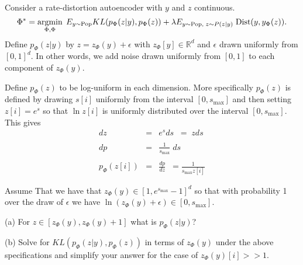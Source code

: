 \documentclass{article}
\newcommand{\solution}[1]{\bigskip {\color{red} {\bf Solution}: #1}}
\begin{document}
Consider a rate-distortion autoencoder with $y$ and $z$ continuous.
$$\Phi^* = \operatorname*{argmin}_{\Phi,\Phi}\;E_{y \sim \mathrm{Pop}} KL(p_\Phi(z|y),p_\Phi(z)) + \lambda E_{y \sim \mathrm{Pop},\;z \sim P(z|y)}\;\mathrm{Dist}(y,y_\Phi(z)).$$
Define $p_\Phi(z|y)$ by $z = z_\Phi(y) + \epsilon$ with $z_\Phi[y] \in \mathbb{R}^d$
and $\epsilon$ drawn uniformly from $[0,1]^d$. In other words,
we add noise drawn uniformly from $[0,1]$ to each component of $z_\Phi(y)$.

\medskip
Define $p_\Phi(z)$ to be log-uniform in each dimension.  More specifically
$p_\Phi(z)$ is defined by drawing $s[i]$ uniformly from the interval
$[0,s_{\mathrm{max}}]$ and then setting $z[i] = e^s$ so that $\ln z[i]$ is uniformly distributed over the interval $[0,s_{\mathrm{max}}]$.
This gives
\begin{eqnarray*}
  dz & = & e^sds  \;\;= \;zds\\
  \\
  dp & = & \frac{1}{s_{\mathrm{max}}}\;ds \\
  \\
  p_\Phi(z[i]) & = & \frac{dp}{dz} \;\;= \frac{1}{s_{\mathrm{max}}z[i]}
\end{eqnarray*}

\medskip
Assume That we have that $z_\Phi(y) \in [1,e^{s_{\mathrm{max}}}-1]^d$ so that with probability 1 over the draw of $\epsilon$ we have
$\ln(z_\Phi(y) + \epsilon) \in [0,s_{\mathrm{max}}]$.

\medskip
(a) For $z \in [z_\Phi(y),z_\Phi(y)+1]$ what is $p_\Phi(z|y)$?

\solution{1}

\medskip
(b) Solve for $KL(p_\Phi(z|y),p_\Phi(z))$ in terms of $z_\Phi(y)$ under the above specifications and simplify your answer
for the case of $z_\Phi(y)[i] >> 1$.
\end{document}
